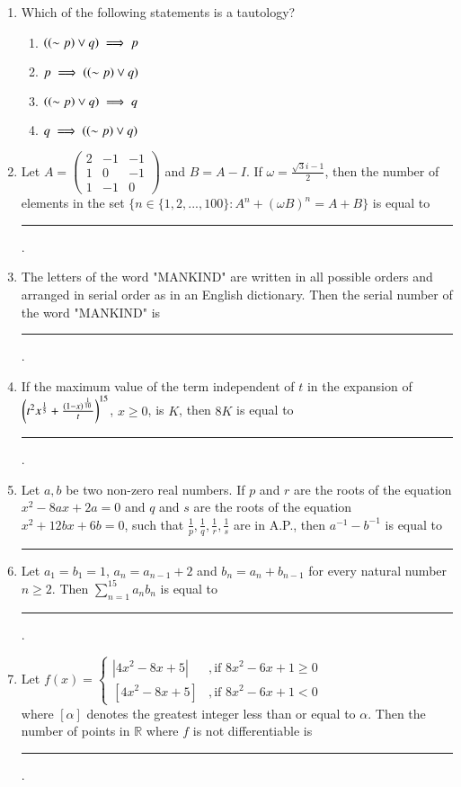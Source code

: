 \documentclass[journal,12pt,onecolumn]{IEEEtran}
\theoremstyle{remark}
\begin{document}
\begin{enumerate}
    \item Which of the following statements is a tautology?
    \begin{enumerate}
        \item $\left(\left(\sim p\right) \lor q\right) \implies p$
        \item $p \implies \left(\left(\sim p\right) \lor q\right)$
        \item $\left(\left(\sim p\right) \lor q\right) \implies q$
        \item $q \implies \left(\left(\sim p\right) \lor q\right)$
    \end{enumerate}

    \item Let $A = \begin{pmatrix} 2 & -1 & -1 \\ 1 & 0 & -1 \\ 1 & -1 & 0 \end{pmatrix}$ and $B = A - I$. If $\omega = \frac{\sqrt{3}i - 1}{2}$, then the number of elements in the set $\{n \in \{1, 2, ..., 100\} : A^n + (\omega B)^n = A + B\}$ is equal to \rule{2.5cm}{0.4pt}.
    
    \item The letters of the word "MANKIND" are written in all possible orders and arranged in serial order as in an English dictionary. Then the serial number of the word "MANKIND" is \rule{2.5cm}{0.4pt}.
    
    \item If the maximum value of the term independent of $t$ in the expansion of $\left(t^{2}x^{\frac{1}{5}}+\frac{\left(1-x\right)^{\frac{1}{10}}}{t}\right)^{15}$, $x \geq 0$, is $K$, then $8K$ is equal to \rule{2.5cm}{0.4pt}.
    
    \item Let $a, b$ be two non-zero real numbers. If $p$ and $r$ are the roots of the equation $x^2 - 8ax + 2a = 0$ and $q$ and $s$ are the roots of the equation $x^2 + 12bx + 6b = 0$, such that $\frac{1}{p}, \frac{1}{q}, \frac{1}{r}, \frac{1}{s}$ are in A.P., then $a^{-1} - b^{-1}$ is equal to \rule{2.5cm}{0.4pt}
    
    \item Let $a_1 = b_1 = 1$, $a_n = a_{n-1} + 2$ and $b_n = a_n + b_{n-1}$ for every natural number $n \geq 2$. Then $\sum_{n=1}^{15} a_n b_n$ is equal to \rule{2.5cm}{0.4pt}.
    
    \item Let $    f(x) =
    \begin{cases}
        |4x^2-8x+5| & , \text{if } 8x^2-6x+1 \geq 0 \\
        [4x^2-8x+5] & , \text{if } 8x^2-6x+1 < 0
    \end{cases}$\\where $[\alpha]$ denotes the greatest integer less than or equal to $\alpha$. Then the number of points in $\mathbb{R}$ where $f$ is not differentiable is \rule{2.5cm}{0.4pt}.
    

\end{enumerate}
\end{document}
